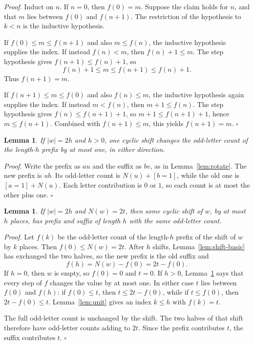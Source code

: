 \documentclass[11pt,letterpaper]{article}
\newtheorem{lemma}[theorem]{Lemma}
\newenvironment{proof}{\noindent\textit{Proof.}}{\hfill\(\square\)}
\begin{document}
\begin{proof}
Induct on \(n\). If \(n=0\), then \(f(0)=m\). Suppose the claim holds for \(n\), and that \(m\) lies between \(f(0)\) and \(f(n+1)\). The restriction of the hypothesis to \(k<n\) is the inductive hypothesis.

If \(f(0)\le m\le f(n+1)\) and also \(m\le f(n)\), the inductive hypothesis supplies the index. If instead \(f(n)<m\), then \(f(n)+1\le m\). The step hypothesis gives \(f(n+1)\le f(n)+1\), so
\[
f(n)+1\le m\le f(n+1)\le f(n)+1.
\]
Thus \(f(n+1)=m\).

If \(f(n+1)\le m\le f(0)\) and also \(f(n)\le m\), the inductive hypothesis again supplies the index. If instead \(m<f(n)\), then \(m+1\le f(n)\). The step hypothesis gives \(f(n)\le f(n+1)+1\), so \(m+1\le f(n+1)+1\), hence \(m\le f(n+1)\). Combined with \(f(n+1)\le m\), this yields \(f(n+1)=m\).
\end{proof}

\begin{lemma}
\label{lem:half-step}
If \(|w|=2h\) and \(h>0\), one cyclic shift changes the odd-letter count of the length-\(h\) prefix by at most one, in either direction.
\end{lemma}

\begin{proof}
Write the prefix as \(au\) and the suffix as \(bv\), as in Lemma~\ref{lem:rotate}. The new prefix is \(ub\). Its odd-letter count is \(N(u)+[b=1]\), while the old one is \([a=1]+N(u)\). Each letter contribution is \(0\) or \(1\), so each count is at most the other plus one.
\end{proof}

\begin{lemma}
\label{lem:equal-cut}
If \(|w|=2h\) and \(N(w)=2t\), then some cyclic shift of \(w\), by at most \(h\) places, has prefix and suffix of length \(h\) with the same odd-letter count.
\end{lemma}

\begin{proof}
Let \(f(k)\) be the odd-letter count of the length-\(h\) prefix of the shift of \(w\) by \(k\) places. Then \(f(0)\le N(w)=2t\). After \(h\) shifts, Lemma~\ref{lem:shift-basic} has exchanged the two halves, so the new prefix is the old suffix and
\[
f(h)=N(w)-f(0)=2t-f(0).
\]
If \(h=0\), then \(w\) is empty, so \(f(0)=0\) and \(t=0\). If \(h>0\), Lemma~\ref{lem:half-step} says that every step of \(f\) changes the value by at most one. In either case \(t\) lies between \(f(0)\) and \(f(h)\): if \(f(0)\le t\), then \(t\le 2t-f(0)\), while if \(t\le f(0)\), then \(2t-f(0)\le t\). Lemma~\ref{lem:unit} gives an index \(k\le h\) with \(f(k)=t\).

The full odd-letter count is unchanged by the shift. The two halves of that shift therefore have odd-letter counts adding to \(2t\). Since the prefix contributes \(t\), the suffix contributes \(t\).
\end{proof}
\end{document}
